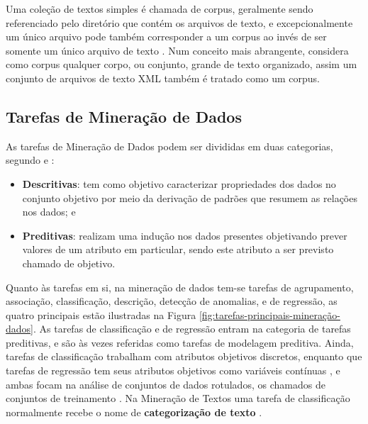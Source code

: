         
        
        Uma coleção de textos simples é chamada de corpus, geralmente sendo referenciado pelo diretório que contém os arquivos de texto, e excepcionalmente um único arquivo pode também corresponder a um corpus ao invés de ser somente um único arquivo de texto \cite[p.~6]{Jo2018TMCIBDC}.
        Num conceito mais abrangente,  considera como corpus qualquer corpo, ou conjunto, grande de texto organizado, assim um conjunto de arquivos de texto XML também é tratado como um corpus.
    
    \subsection{Tarefas de Mineração de Dados} \label{subsec:Tarefas-de-Mineração-de-Dados}
        As tarefas de Mineração de Dados podem ser divididas em duas categorias, segundo  e : 
        \begin{itemize}
            \item \textbf{Descritivas}: tem como objetivo caracterizar propriedades dos dados no conjunto objetivo por meio da derivação de padrões que resumem as relações nos dados; e
            
            \item \textbf{Preditivas}: realizam uma indução nos dados presentes objetivando prever valores de um atributo em particular, sendo este atributo a ser previsto chamado de objetivo. 
        \end{itemize}
        
        Quanto às tarefas em si, na mineração de dados tem-se tarefas de agrupamento, associação, classificação, descrição, detecção de anomalias, e de regressão, as quatro principais estão ilustradas na Figura \ref{fig:tarefas-principais-mineração-dados}.
        As tarefas de classificação e de regressão entram na categoria de tarefas preditivas, e são às vezes referidas como tarefas de modelagem preditiva. Ainda, tarefas de classificação trabalham com atributos objetivos discretos, enquanto que tarefas de regressão tem seus atributos objetivos como variáveis contínuas , e ambas focam na análise de conjuntos de dados rotulados, os chamados de conjuntos de treinamento \cite[p.~19]{Han:2011:DMC:1972541}.
        Na Mineração de Textos uma tarefa de classificação normalmente recebe o nome de \textbf{categorização de texto} \cite[p.~6]{TurchiATPUKM2009} \cite[p.~61]{Feldman:2006:TMH:1076381}.
        
